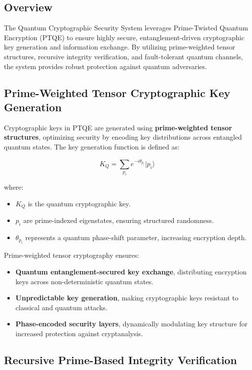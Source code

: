 \documentclass{article}
\theoremstyle{plain}
\begin{document}
\subsection{Overview}

The Quantum Cryptographic Security System leverages Prime-Twisted Quantum Encryption (PTQE) to ensure highly secure, entanglement-driven cryptographic key generation and information exchange. By utilizing prime-weighted tensor structures, recursive integrity verification, and fault-tolerant quantum channels, the system provides robust protection against quantum adversaries.

\subsection{Prime-Weighted Tensor Cryptographic Key Generation}

Cryptographic keys in PTQE are generated using \textbf{prime-weighted tensor structures}, optimizing security by encoding key distributions across entangled quantum states. The key generation function is defined as:

\begin{equation}
    K_Q = \sum_{p_i} e^{-i \theta_{p_i}} |p_i \rangle
\end{equation}

where:
\begin{itemize}
    \item \( K_Q \) is the quantum cryptographic key.
    \item \( p_i \) are prime-indexed eigenstates, ensuring structured randomness.
    \item \( \theta_{p_i} \) represents a quantum phase-shift parameter, increasing encryption depth.
\end{itemize}

Prime-weighted tensor cryptography ensures:
\begin{itemize}
    \item \textbf{Quantum entanglement-secured key exchange}, distributing encryption keys across non-deterministic quantum states.
    \item \textbf{Unpredictable key generation}, making cryptographic keys resistant to classical and quantum attacks.
    \item \textbf{Phase-encoded security layers}, dynamically modulating key structure for increased protection against cryptanalysis.
\end{itemize}

\subsection{Recursive Prime-Based Integrity Verification}
\end{document}
